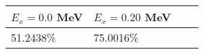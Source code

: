 \begin{tabular}{llll} \hline
\toprule 
$E_{x}=0.0$ MeV & $E_{x}=0.20$ MeV \\ 
 \midrule 
 51.2438\% & 75.0016\% &\\ 
\bottomrule 
\end{tabular}

